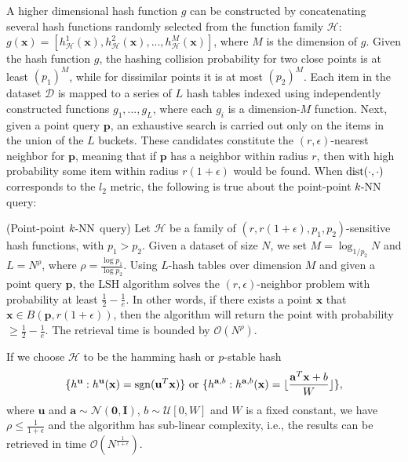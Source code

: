 A higher dimensional hash function $g$ can be constructed by concatenating several hash functions randomly selected from the function family $\mathcal H$: $g(\mathbf x) = [h_{\mathcal H}^{1}(\mathbf x), h_{\mathcal H}^{2}(\mathbf x), ..., h_{\mathcal H}^{M}(\mathbf x)]$, where $M$ is the dimension of $g$.
Given the hash function $g$, the hashing collision probability for two close points is at least $(p_1)^M$, while for dissimilar points it is at most $(p_2)^M$. Each item in the dataset $\mathcal D$ is mapped to a series of $L$ hash tables indexed using independently constructed functions $g_1, ..., g_L$, where each $g_i$ is a dimension-$M$ function. Next, given a point query $\mathbf p$, an exhaustive search is carried out only on the items in the union of the $L$ buckets. These candidates constitute the $(r,\epsilon)$-nearest neighbor for $\mathbf p$, meaning that if $\mathbf p$ has a neighbor within radius $r$, then with high probability some item within radius $r(1+\epsilon)$ would be found. When $\operatorname{dist}(\cdot, \cdot)$ corresponds to the $l_2$ metric, the following is true about the point-point $k\text{-NN}$ query:
\begin{theorem}
  \label{thm:3:pplsh}
  (Point-point $k\text{-NN}$ query) \cite{Datar:2004:LHS} Let $\mathcal H$ be a family of $(r, r(1+\epsilon), p_1, p_2)$-sensitive hash functions, with $p_1 > p_2$. Given a dataset of size $N$, we set $M = \log_{1/p_2} N$ and $L = N^{\rho}$, where $\rho = \frac{\log p_1}{\log p_2}$. Using $L$-hash tables over dimension $M$ and given a point query $\mathbf p$, the LSH algorithm solves the $(r, \epsilon)$-neighbor problem with probability at least $\frac{1}{2} - \frac{1}{e}$. In other words, if there exists a point $\mathbf x$ that $\mathbf x \in B(\mathbf p, r(1+\epsilon))$, then the algorithm will return the point with probability $\geq \frac{1}{2} - \frac{1}{e}$. The retrieval time is bounded by $\mathcal O(N^{\rho})$.
\end{theorem}

If we choose $\mathcal H$ to be the hamming hash or $p$-stable hash
\begin{equation}
  \begin{aligned}
    \label{eq:3:hashfunc}
    \{h^{\mathbf u} : h^{\mathbf u}(\mathbf x) = \operatorname{sgn}(\mathbf u^T \mathbf x)\} \text{\ or\ } \{h^{\mathbf a, b} : h^{\mathbf a, b}(\mathbf x) = \lfloor \frac{\mathbf a^T \mathbf x + b}{W}\rfloor\},
  \end{aligned}
\end{equation}
where $\mathbf u$ and $\mathbf a \sim \mathcal N(\mathbf 0, \mathbf I)$, $b \sim \mathcal U[0, W]$ and $W$ is a fixed constant, we have $\rho \leq \frac{1}{1+\epsilon}$ and the algorithm has sub-linear complexity, i.e., the results can be retrieved in time $\mathcal O(N^{\frac{1}{1+\epsilon}})$.


